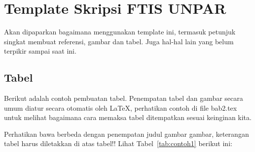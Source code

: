 %

\section{Template Skripsi FTIS UNPAR}
\label{sec:template}
 
Akan dipaparkan bagaimana menggunakan template ini, termasuk petunjuk singkat membuat referensi, gambar dan tabel.
Juga hal-hal lain yang belum terpikir sampai saat ini. 
 

\subsection{Tabel}  
Berikut adalah contoh pembuatan tabel. 
Penempatan tabel dan gambar secara umum diatur secara otomatis oleh \LaTeX{}, perhatikan contoh di file bab2.tex untuk melihat bagaimana cara memaksa tabel ditempatkan sesuai keinginan kita.

Perhatikan bawa berbeda dengan penempatan judul gambar gambar, keterangan tabel harus diletakkan di atas tabel!!
Lihat Tabel~\ref{tab:contoh1} berikut ini:

